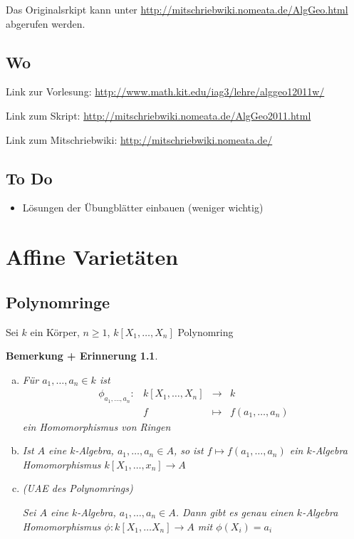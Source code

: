 \documentclass[a4paper, 12pt, numbers=noendperiod, chapterprefix=true]{scrbook}
\theoremstyle{break}
\newtheorem{BemErinn}[Def]{Bemerkung + Erinnerung}
\theoremstyle{nonumberbreak}
\theoremstyle{nonumberplain}
\begin{document}
Das Originalsrkipt kann unter \url{http://mitschriebwiki.nomeata.de/AlgGeo.html} abgerufen werden.

\section*{Wo}
Link zur Vorlesung: \url{http://www.math.kit.edu/iag3/lehre/alggeo12011w/}

Link zum Skript: \url{http://mitschriebwiki.nomeata.de/AlgGeo2011.html}

Link zum Mitschriebwiki: \url{http://mitschriebwiki.nomeata.de/}

\section*{To Do}\begin{itemize}
\item L\"osungen der \"Ubungbl\"atter einbauen (weniger wichtig)
\end{itemize}


\chapter{Affine Variet\"aten}

\section{Polynomringe}

Sei $k$ ein K\"orper, $n \geq 1$, $k[X_1,\dots,X_n]$ Polynomring

\begin{BemErinn}\label{bemerinn:1.1}
\begin{enumerate}[a)]
\item F\"ur $a_1, \dots, a_n \in k$ ist
	\[\begin{array}{lccc}
		\phi_{a_1,\dots,a_n}: &k[X_1, \dots, X_n] &\to& k \\
		&f &\mapsto& f(a_1, \dots, a_n)
	\end{array}\]
	ein Homomorphismus von Ringen
	
\item Ist $A$ eine $k$-Algebra, $a_1,\dots, a_n \in A$, so ist $f \mapsto f(a_1, \dots,a_n)$ ein $k$-Algebra Homomorphismus $k[X_1,\dots,x_n] \to A$
	
\item (UAE des Polynomrings)

	Sei $A$ eine $k$-Algebra, $a_1,\dots,a_n\in A$. Dann gibt es genau einen $k$-Algebra Homomorphismus $\phi:k[X_1,\dots X_n] \to A$ mit $\phi(X_i) = a_i$\label{bemerinn:1.1.c}
\end{enumerate}
\end{BemErinn}
\end{document}
